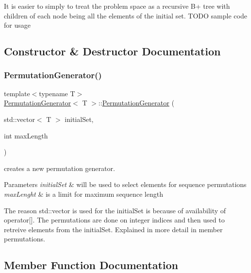 It is easier to simply to treat the problem space as a recursive B+ tree with children of each node being all the elements of the initial set. T\+O\+DO sample code for usage 

\subsection{Constructor \& Destructor Documentation}
\mbox{\label{classPermutationGenerator_a8bd348f28ef2830e335056f877246244}} 
\subsubsection{\texorpdfstring{Permutation\+Generator()}{PermutationGenerator()}}
{\footnotesize\ttfamily template$<$typename T$>$ \\
\hyperlink{classPermutationGenerator}{Permutation\+Generator}$<$ T $>$\+::\hyperlink{classPermutationGenerator}{Permutation\+Generator} (\begin{DoxyParamCaption}\item[{std\+::vector$<$ T $>$}]{initial\+Set,  }\item[{int}]{max\+Length }\end{DoxyParamCaption})}

creates a new permutation generator. 
\begin{DoxyParams}{Parameters}
{\em initial\+Set} & will be used to select elements for sequence permutations \\
\hline
{\em max\+Lenght} & is a limit for maximum sequence length\\
\hline
\end{DoxyParams}
The reason std\+::vector is used for the initial\+Set is because of availability of operator\mbox{[}\mbox{]}. The permutations are done on integer indices and then used to retreive elements from the initial\+Set. Explained in more detail in member permutations. 

\subsection{Member Function Documentation}
\mbox{\label{classPermutationGenerator_a7d5c9dcbe711a74de2ac73ef128a52c9}} 
